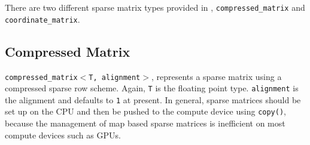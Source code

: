 There are two different sparse matrix types provided in {\ViennaCL}, \texttt{compressed\_matrix} and \texttt{coordinate\_matrix}.


\subsection{Compressed Matrix}
\texttt{compressed\_matrix$<$T, alignment$>$}, represents a sparse
matrix using a compressed sparse row scheme. Again, \texttt{T} is the floating point type. \texttt{alignment} is the alignment and defaults to \texttt{1} at present.
In general, sparse matrices should be set up on the
CPU and then be pushed to the compute device using \texttt{copy()}, because the management of map
based sparse matrices is inefficient on most compute devices such as GPUs.

